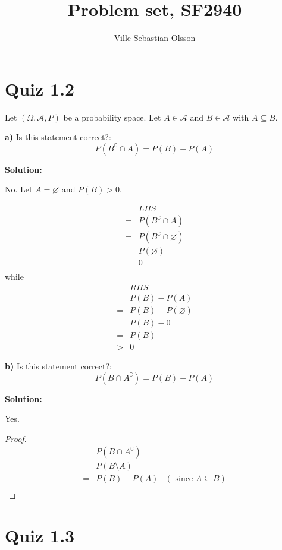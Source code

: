 \documentclass{article}
\title{Problem set, SF2940}
\author{Ville Sebastian Olsson}
\begin{document}
\maketitle

\section{Quiz 1.2}

Let \((\Omega, \mathcal{A}, P)\) be a probability space.
Let \(A\in \mathcal{A}\) and \(B\in \mathcal{A}\)
with \(A\subseteq B\).

\textbf{a)} Is this statement correct?:
\[P(B^\complement \cap A) = P(B)-P(A)\]

\textbf{Solution:}

No. Let \(A=\varnothing\) and \(P(B)>0\).

\begin{align*}
	 & LHS \\
	=& P(B^\complement \cap A) \\
	=& P(B^\complement \cap \varnothing) \\
	=& P(\varnothing) \\
	=& 0 \\
\end{align*}
while
\begin{align*}
	  & RHS \\
	 =& P(B)-P(A) \\
	 =& P(B)-P(\varnothing) \\
	 =& P(B)-0 \\
	 =& P(B) \\
	 >& 0
\end{align*}

\textbf{b)} Is this statement correct?:
\[P(B \cap A^\complement) = P(B)-P(A)\]

\textbf{Solution:}

Yes.
\begin{proof}
\begin{align*}
	 & P(B\cap A^\complement) \\
	=& P(B\setminus A) \\
	=& P(B)-P(A) & (\text{ since }A\subseteq B) \\
\end{align*}
\end{proof}

\section{Quiz 1.3}
\end{document}
